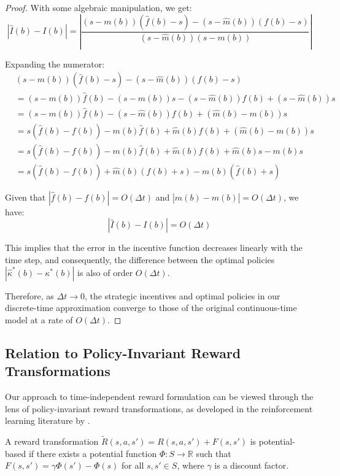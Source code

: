 \begin{proof}
With some algebraic manipulation, we get:
\begin{equation}
    |\hat{I}(b) - I(b)| = \left|\frac{(s - m(b))(\hat{f}(b) - s) - (s - \hat{m}(b))(f(b) - s)}{(s - \hat{m}(b))(s - m(b))}\right|
\end{equation}

Expanding the numerator:
\begin{align}
    &(s - m(b))(\hat{f}(b) - s) - (s - \hat{m}(b))(f(b) - s) \\
    &= (s - m(b))\hat{f}(b) - (s - m(b))s - (s - \hat{m}(b))f(b) + (s - \hat{m}(b))s \\
    &= (s - m(b))\hat{f}(b) - (s - \hat{m}(b))f(b) + (\hat{m}(b) - m(b))s \\
    &= s(\hat{f}(b) - f(b)) - m(b)\hat{f}(b) + \hat{m}(b)f(b) + (\hat{m}(b) - m(b))s \\
    &= s(\hat{f}(b) - f(b)) - m(b)\hat{f}(b) + \hat{m}(b)f(b) + \hat{m}(b)s - m(b)s \\
    &= s(\hat{f}(b) - f(b)) + \hat{m}(b)(f(b) + s) - m(b)(\hat{f}(b) + s)
\end{align}

Given that $|\hat{f}(b) - f(b)| = O(\Delta t)$ and $|\hat{m}(b) - m(b)| = O(\Delta t)$, we have:
\begin{equation}
    |\hat{I}(b) - I(b)| = O(\Delta t)
\end{equation}

This implies that the error in the incentive function decreases linearly with the time step, and consequently, the difference between the optimal policies $|\hat{\kappa}^*(b) - \kappa^*(b)|$ is also of order $O(\Delta t)$.

Therefore, as $\Delta t \to 0$, the strategic incentives and optimal policies in our discrete-time approximation converge to those of the original continuous-time model at a rate of $O(\Delta t)$.
\end{proof}

\subsection{Relation to Policy-Invariant Reward Transformations}
\label{appendix:policy_invariance}

Our approach to time-independent reward formulation can be viewed through the lens of policy-invariant reward transformations, as developed in the reinforcement learning literature by \citet{ng1999policy}.

\begin{definition}
A reward transformation $\tilde{R}(s, a, s') = R(s, a, s') + F(s, s')$ is potential-based if there exists a potential function $\Phi: S \to \mathbb{R}$ such that $F(s, s') = \gamma\Phi(s') - \Phi(s)$ for all $s, s' \in S$, where $\gamma$ is a discount factor.
\end{definition}

